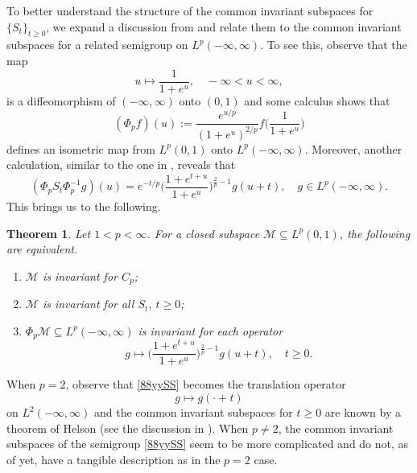 \documentclass[11pt]{amsart}
\numberwithin{equation}{section}
\theoremstyle{plain}
\newtheorem{Theorem}[equation]{Theorem}
\theoremstyle{definition}
\renewcommand{\geq}{\geqslant}
\renewcommand{\subset}{\subseteq}
\newcommand{\0}{{\color{lightgray}0}}
\begin{document}
To better understand  the structure of the common invariant subspaces for $\{S_t\}_{t \geq 0}$, we expand a discussion from \cite{CL2} and relate them to the common invariant subspaces for a related semigroup  on $L^p(-\infty, \infty)$.  To see this, observe that the map 
$$u \mapsto \frac{1}{1 + e^{u}}, \quad -\infty < u < \infty,$$ is a diffeomorphism of $(-\infty, \infty)$ onto $(0, 1)$ and some calculus shows that 
$$(\Phi_{p}  f)(u) := \frac{e^{u/p}}{(1 + e^u)^{2/p}} f\big(\frac{1}{1 + e^u}\big)$$
defines an isometric map from $L^p(0, 1)$ onto $L^{p}(-\infty, \infty)$. Moreover, another calculation, similar to the one in \cite{CL2},  reveals that 
$$(\Phi_{p} S_{t} \Phi_{p}^{-1} g)(u) = e^{-t/p} \Big(\frac{1 + e^{t + u}}{1 + e^u}\Big)^{\frac{2}{p} - 1} g(u + t), \quad g \in L^{p}(-\infty, \infty).$$ This brings us to the following. 

\begin{Theorem}
Let $1 < p < \infty$. For a closed subspace $\mathcal{M} \subset L^p(0, 1)$, the following are equivalent. 
\begin{enumerate}
\item $\mathcal{M}$ is invariant for $C_p$;
\item $\mathcal{M}$ is invariant for all $S_t$, $t \geq 0$;
\item $\Phi_{p} \mathcal{M} \subset L^p(-\infty, \infty)$ is invariant for each operator 
\begin{equation}\label{88yySS}
g \mapsto \Big(\frac{1 + e^{t + u}}{1 + e^u}\Big)^{\frac{2}{p} - 1} g(u + t), \quad t \geq 0.
\end{equation}
\end{enumerate}
\end{Theorem}

When $p = 2$, observe that \eqref{88yySS} becomes the translation operator 
$$g \mapsto g(\cdot + t)$$ on $L^2(-\infty, \infty)$ and the common invariant subspaces for $t \geq 0$ are known by a theorem of Helson \cite{MR0171178} (see the discussion in \cite{CL2}). When $p \not = 2$, the common invariant subspaces of the semigroup \eqref{88yySS} seem to be more complicated and do not, as of yet, have a tangible description as in the $p = 2$ case. 
\end{document}
